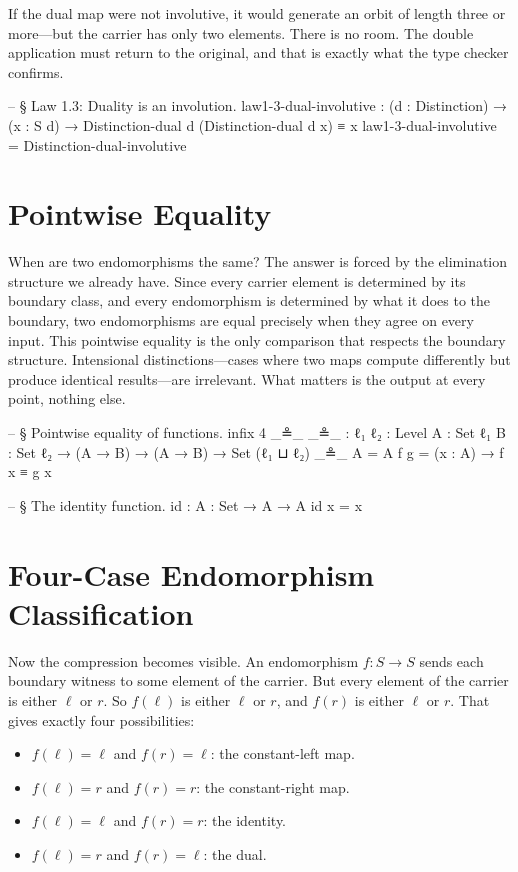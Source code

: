 \documentclass[11pt,a4paper]{book}
\begin{document}
If the dual map were not involutive, it would generate an orbit of length three or more—but the carrier has only two elements. There is no room. The double application must return to the original, and that is exactly what the type checker confirms.

\begin{code}
-- § Law 1.3: Duality is an involution.
law1-3-dual-involutive :
  (d : Distinction) →
  (x : S d) →
  Distinction-dual d (Distinction-dual d x) ≡ x
law1-3-dual-involutive = Distinction-dual-involutive
\end{code}

\section{Pointwise Equality}

When are two endomorphisms the same? The answer is forced by the elimination structure we already have. Since every carrier element is determined by its boundary class, and every endomorphism is determined by what it does to the boundary, two endomorphisms are equal precisely when they agree on every input. This pointwise equality is the only comparison that respects the boundary structure. Intensional distinctions—cases where two maps compute differently but produce identical results—are irrelevant. What matters is the output at every point, nothing else.

\begin{code}
-- § Pointwise equality of functions.
infix 4 _≗_
_≗_ : {ℓ₁ ℓ₂ : Level} {A : Set ℓ₁} {B : Set ℓ₂} → (A → B) → (A → B) → Set (ℓ₁ ⊔ ℓ₂)
_≗_ {A = A} f g = (x : A) → f x ≡ g x

-- § The identity function.
id : {A : Set} → A → A
id x = x
\end{code}

\section{Four-Case Endomorphism Classification}

Now the compression becomes visible. An endomorphism $f : S \to S$ sends each boundary witness to some element of the carrier. But every element of the carrier is either $\ell$ or $r$. So $f(\ell)$ is either $\ell$ or $r$, and $f(r)$ is either $\ell$ or $r$. That gives exactly four possibilities:

\begin{itemize}
\item $f(\ell) = \ell$ and $f(r) = \ell$: the constant-left map.
\item $f(\ell) = r$ and $f(r) = r$: the constant-right map.
\item $f(\ell) = \ell$ and $f(r) = r$: the identity.
\item $f(\ell) = r$ and $f(r) = \ell$: the dual.
\end{itemize}
\end{document}
